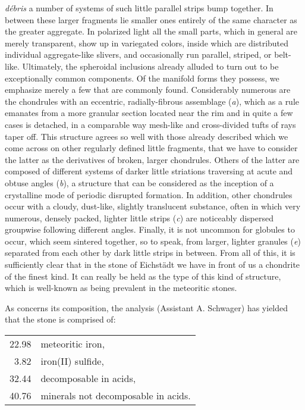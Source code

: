 \documentclass[a4paper, 12pt, oneside]{article}
\begin{document}
\emph{débris} a number of systems of such little parallel strips bump together. In between these larger fragments lie smaller ones entirely of the same character as the greater aggregate. In polarized light all the small parts, which in general are merely transparent, show up in variegated colors, inside which are distributed individual aggregate-like slivers, and occasionally run parallel, striped, or belt-like. Ultimately, the spheroidal inclusions already alluded to turn out to be exceptionally common components. Of the manifold forms they possess, we emphasize merely a few that are commonly found. Considerably numerous are the chondrules with an eccentric, radially-fibrous assemblage (\emph{a}), which as a rule emanates from a more granular section located near the rim and in quite a few cases is detached, in a comparable way mesh-like and cross-divided tufts of rays taper off. This structure agrees so well with those already described which we come across on other regularly defined little fragments, that we have to consider the latter as the derivatives of broken, larger chondrules. Others of the latter are composed of different systems of darker little striations traversing at acute and obtuse angles (\emph{b}), a structure that can be considered as the inception of a crystalline mode of periodic disrupted formation. In addition, other chondrules occur with a cloudy, dust-like, slightly translucent substance, often in which very numerous, densely packed, lighter little strips (\emph{c}) are noticeably dispersed groupwise following different angles. Finally, it is not uncommon for globules to occur, which seem sintered together, so to speak, from larger, lighter granules (\emph{e}) separated from each other by dark little strips in between. From all of this, it is sufficiently clear that in the stone of Eichstädt we have in front of us a chondrite of the finest kind. It can really be held as the type of this kind of structure, which is well-known as being prevalent in the meteoritic stones.

As concerns its composition, the analysis (Assistant A. Schwager) has yielded that the stone is comprised of: 
\begin{center}
    \begin{tabular}{r l}
        22.98 & meteoritic iron,\\
        3.82 & iron(II) sulfide,\\
        32.44 & decomposable in acids,\\
        40.76 & minerals not decomposable in acids.\\
    \end{tabular}
\end{center}
\end{document}
